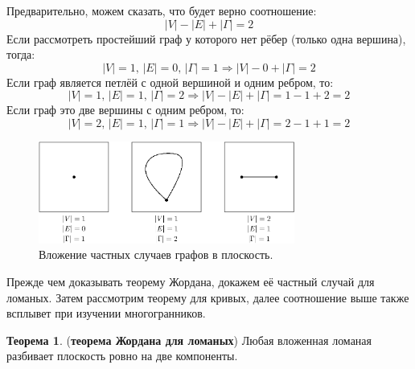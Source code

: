 \documentclass[12pt]{article}
\theoremstyle{definition}
\newtheorem{theorem}{Теорема}
\begin{document}
Предварительно, можем сказать, что будет верно соотношение: 
$$
	|V| - |E| + |\Gamma| = 2
$$ 
Если рассмотреть простейший граф у которого нет рёбер (только одна вершина), тогда:
$$
	|V| = 1, \, |E| = 0, \, |\Gamma| = 1 \Rightarrow |V| - 0 + |\Gamma| = 2
$$
Если граф является петлёй с одной вершиной и одним ребром, то:
$$
	|V| = 1, \, |E| = 1, \, |\Gamma| = 2 \Rightarrow |V| - |E| + |\Gamma| = 1 - 1  + 2 = 2
$$
Если граф это две вершины с одним ребром, то:
$$
	|V| = 2, \, |E| = 1, \, |\Gamma| = 1 \Rightarrow |V| - |E| + |\Gamma| = 2 - 1  + 1 = 2
$$
\begin{figure}[H]
	\centering
	\includegraphics[width=0.75\textwidth]{GATL3_1.eps}
	\caption{Вложение частных случаев графов в плоскость.}
	\label{3_1}
\end{figure}
Прежде чем доказывать теорему Жордана, докажем её частный случай для ломаных. Затем рассмотрим теорему для кривых, далее соотношение выше также всплывет при изучении многогранников.
\newpage
\begin{theorem}(\textbf{теорема Жордана для ломаных})
	Любая вложенная ломаная разбивает плоскость ровно на две компоненты.
\end{theorem}
\end{document}
